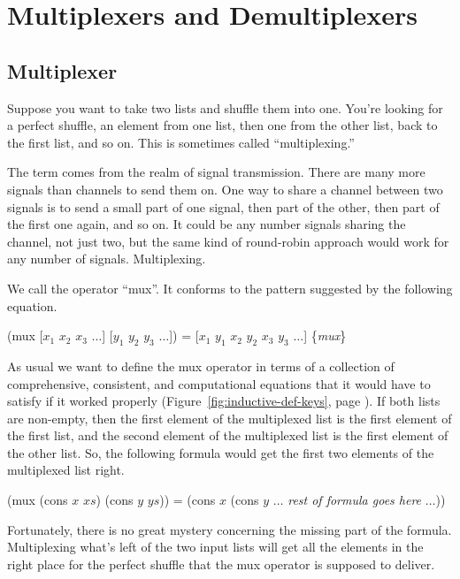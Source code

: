 \chapter{Multiplexers and Demultiplexers}
\label{ch:mux-dmx}

\section{Multiplexer}
\label{sec:mux}

Suppose you want to take two lists and shuffle them into one.
You're looking for a perfect shuffle, an element from one list,
then one from the other list, back to the first list, and so on.
This is sometimes called ``multiplexing.''

The term comes from the realm of signal transmission.
There are many more signals than channels to send them on.
One way to share a channel between two signals is to
send a small part of one signal, then part of the other,
then part of the first one again, and so on.
It could be any number signals sharing the channel, not just two,
but the same kind of round-robin approach would work for any
number of signals.
Multiplexing.

We call the operator ``mux''.
It conforms to the pattern suggested by the following equation.

\hspace{1cm} (mux [$x_1$ $x_2$ $x_3$ $\dots$] [$y_1$ $y_2$ $y_3$ $\dots$]) =
     [$x_1$ $y_1$ $x_2$ $y_2$ $x_3$ $y_3$ $\dots$] \hfill \{\emph{mux}\}

As usual we want to define the mux operator in terms of
a collection of comprehensive, consistent, and computational equations
that it would have to satisfy if it worked properly
(Figure~\ref{fig:inductive-def-keys}, page \pageref{fig:inductive-def-keys}).
If both lists are non-empty,
then the first element of the multiplexed list is the first element of the first list,
and the second element of the multiplexed list is the first element of the other list.
So, the following formula would
get the first two elements of the multiplexed list right.

\hspace{1cm} (mux (cons $x$ $xs$) (cons $y$ $ys$)) =
(cons $x$ (cons $y$ $\dots$ \emph{rest of formula goes here} $\dots$))

Fortunately, there is no great mystery concerning the missing part of the formula.
Multiplexing what's left of the two input lists will get all the elements
in the right place for the perfect shuffle that the mux operator is supposed to deliver.

